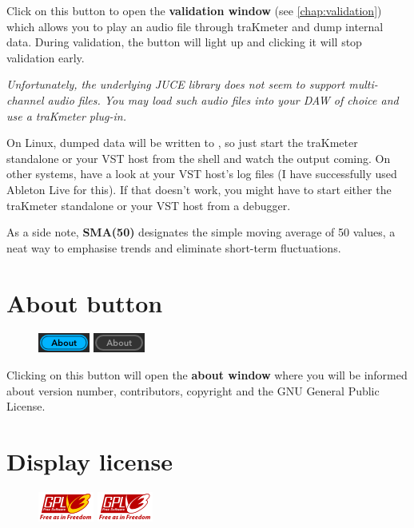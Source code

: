 Click on this button to open the \textbf{validation window} (see
\ref{chap:validation}) which allows you to play an audio file through
traKmeter and dump internal data.  During validation, the button will
light up and clicking it will stop validation early.

\emph{Unfortunately, the underlying JUCE library does not seem to
  support multi-channel audio files.  You may load such audio files
  into your DAW of choice and use a traKmeter plug-in.}

On Linux, dumped data will be written to , so just start
the traKmeter standalone or your VST host from the shell and watch the
output coming.  On other systems, have a look at your VST host's log
files (I have successfully used Ableton Live for this).  If that
doesn't work, you might have to start either the traKmeter standalone
or your VST host from a debugger.

As a side note, \textbf{SMA(50)} designates the simple moving average
of 50 values, a neat way to emphasise trends and eliminate short-term
fluctuations.

\section{About button}

\begin{figure}
\includegraphics[scale=\screenshotscale,clip]{include/images/button_about_on.png}
\newline \vspace{-0.9\baselineskip}
\includegraphics[scale=\screenshotscale,clip]{include/images/button_about_off.png}
\end{figure}

Clicking on this button will open the \textbf{about window} where you
will be informed about version number, contributors, copyright and the
GNU General Public License.

\section{Display license}

\begin{figure}
\includegraphics[scale=\screenshotscale,clip]{include/images/button_gpl_on.png}
\newline \vspace{-0.9\baselineskip}
\includegraphics[scale=\screenshotscale,clip]{include/images/button_gpl_off.png}
\end{figure}

